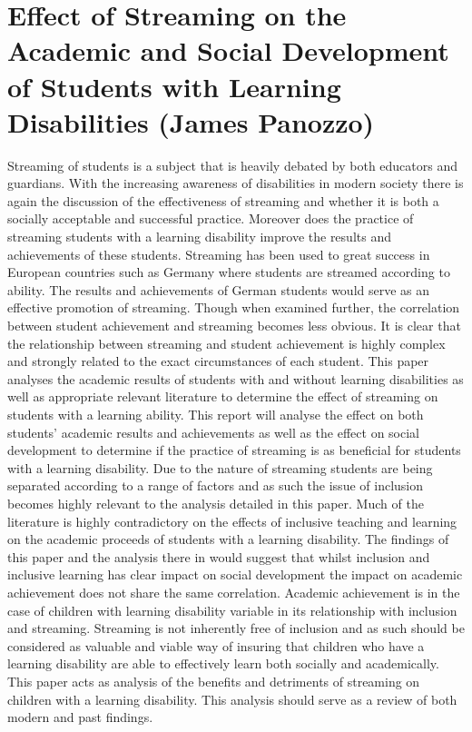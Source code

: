 \documentclass[twoside,12pt,a4paper,notitlepage]{memoir}
\begin{document}
\pagebreak
\section*{Effect of Streaming on the Academic and Social Development of Students with Learning Disabilities (James Panozzo)}
\label{aut:panozzo}

Streaming of students is a subject that is heavily debated by both educators and guardians. With the increasing awareness of disabilities in modern society there is again the discussion of the effectiveness of streaming and whether it is both a socially acceptable and successful practice. Moreover does the practice of streaming students with a learning disability improve the results and achievements of these students. Streaming has been used to great success in European countries such as Germany where students are streamed according to ability. The results and achievements of German students would serve as an effective promotion of streaming. Though when examined further, the correlation between student achievement and streaming becomes less obvious. It is clear that the relationship between streaming and student achievement is highly complex and strongly related to the exact circumstances of each student. This paper analyses the academic results of students with and without learning disabilities as well as appropriate relevant literature to determine the effect of streaming on students with a learning ability. This report will analyse the effect on both students’ academic results and achievements as well as the effect on social development to determine if the practice of streaming is as beneficial for students with a learning disability. Due to the nature of streaming students are being separated according to a range of factors and as such the issue of inclusion becomes highly relevant to the analysis detailed in this paper. Much of the literature is highly contradictory on the effects of inclusive teaching and learning on the academic proceeds of students with a learning disability. The findings of this paper and the analysis there in would suggest that whilst inclusion and inclusive learning has clear impact on social development the impact on academic achievement does not share the same correlation. Academic achievement is in the case of children with learning disability variable in its relationship with inclusion and streaming. Streaming is not inherently free of inclusion and as such should be considered as valuable and viable way of insuring that children who have a learning disability are able to effectively learn both socially and academically. This paper acts as analysis of the benefits and detriments of streaming on children with a learning disability. This analysis should serve as a review of both modern and past findings. 
\end{document}
